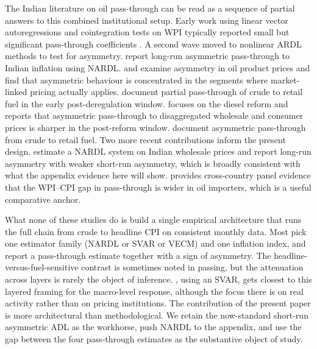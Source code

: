 \documentclass[11pt,a4paper]{article}
\begin{document}
The Indian literature on oil pass-through can be read as a sequence of partial answers to this combined institutional setup. Early work using linear vector autoregressions and cointegration tests on WPI typically reported small but significant pass-through coefficients \citep{bhoi2012,bhanumurthy2012}. A second wave moved to nonlinear ARDL methods to test for asymmetry. \citet{abubakar2018} report long-run asymmetric pass-through to Indian inflation using NARDL. \citet{chattopadhyay2015} and \citet{pal2016} examine asymmetry in oil product prices and find that asymmetric behaviour is concentrated in the segments where market-linked pricing actually applies. \citet{pandey2019} document partial pass-through of crude to retail fuel in the early post-deregulation window. \citet{pradeep2022} focuses on the diesel reform and reports that asymmetric pass-through to disaggregated wholesale and consumer prices is sharper in the post-reform window. \citet{deheri2024} document asymmetric pass-through from crude to retail fuel. Two more recent contributions inform the present design. \citet{suresh2026} estimate a NARDL system on Indian wholesale prices and report long-run asymmetry with weaker short-run asymmetry, which is broadly consistent with what the appendix evidence here will show. \citet{sek2019} provides cross-country panel evidence that the WPI--CPI gap in pass-through is wider in oil importers, which is a useful comparative anchor.

What none of these studies do is build a single empirical architecture that runs the full chain from crude to headline CPI on consistent monthly data. Most pick one estimator family (NARDL or SVAR or VECM) and one inflation index, and report a pass-through estimate together with a sign of asymmetry. The headline-versus-fuel-sensitive contrast is sometimes noted in passing, but the attenuation across layers is rarely the object of inference. \citet{sadath2021}, using an SVAR, gets closest to this layered framing for the macro-level response, although the focus there is on real activity rather than on pricing institutions. The contribution of the present paper is more architectural than methodological. We retain the now-standard short-run asymmetric ADL as the workhorse, push NARDL to the appendix, and use the gap between the four pass-through estimates as the substantive object of study.
\end{document}
